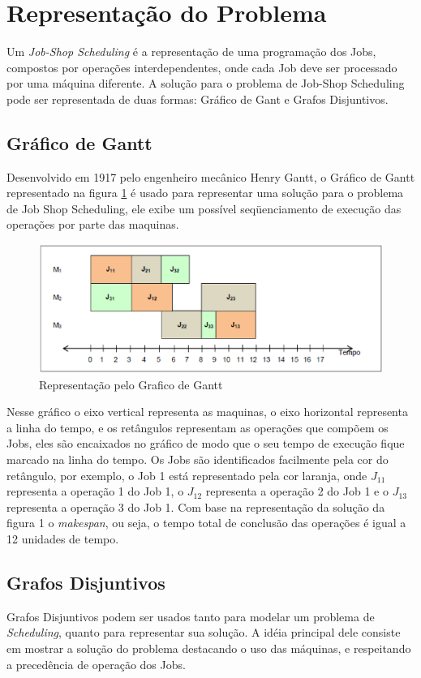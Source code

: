\section{Representação do Problema}\label{sec:rep_prob}
Um \textit{Job-Shop Scheduling} é a representação de uma programação dos Jobs, compostos por operações interdependentes, onde cada Job deve ser processado por uma máquina diferente. A solução para o problema de Job-Shop Scheduling pode ser representada de duas formas: Gráfico de Gant e Grafos Disjuntivos.

\subsection{Gráfico de Gantt}
Desenvolvido em 1917 pelo engenheiro mecânico Henry Gantt, o Gráfico de Gantt representado na figura \ref{graf_gantt} é usado para representar uma solução para o problema de Job Shop Scheduling, ele exibe um possível seqüenciamento de execução das operações por parte das maquinas.

\begin{figure}[H]
\centering
\includegraphics[scale = 0.6]{graficos/graf_gantt.eps}
\caption{Representação pelo Grafico de Gantt}
\label{graf_gantt}
\end{figure}

Nesse gráfico o eixo vertical representa as maquinas, o eixo horizontal representa a linha do tempo, e os retângulos representam as operações que compõem os Jobs, eles são encaixados no gráfico de modo que o seu tempo de execução fique marcado na linha do tempo. Os Jobs são identificados facilmente pela cor do retângulo, por exemplo, o Job 1 está representado pela cor laranja, onde $J_{11}$ representa a operação 1 do Job 1, o $J_{12}$ representa a operação 2 do Job 1 e o $J_{13}$ representa a operação 3 do Job 1. Com base na representação da solução da figura 1 o \textit{makespan}, ou seja, o tempo total de conclusão das operações é igual a 12 unidades de tempo.

\subsection{Grafos Disjuntivos}
Grafos Disjuntivos podem ser usados tanto para modelar um problema de \textit{Scheduling}, quanto para representar sua solução. A idéia principal dele consiste em mostrar a solução do problema destacando o uso das máquinas, e respeitando a precedência de operação dos Jobs. 

